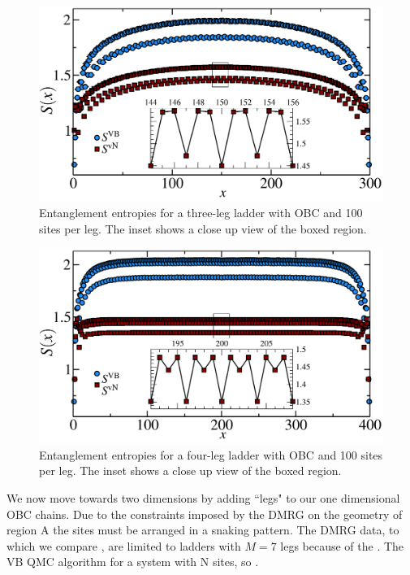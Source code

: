 \begin{figure} { \includegraphics[width=6in]{./figures/paper1/figure3/3-leg-ladder/fig3_final2.pdf}
\caption[Entanglement entropies for a three-leg ladder]{
Entanglement entropies for a three-leg ladder with OBC and 100 sites per leg.  
The inset shows a close up view of the boxed region.
 \label{ladder3} }} 
 \end{figure}
 
 
 \begin{figure} { \includegraphics[width=6in]{./figures/paper1/figure3/4-leg-ladder/4legfig.pdf}
\caption[Entanglement entropies for a four-leg ladder]{
Entanglement entropies for a four-leg ladder with OBC and 100 sites per leg.  
The inset shows a close up view of the boxed region.  
 \label{ladder4} }} 
 \end{figure}
 
 We now move towards two dimensions by adding ``legs" to our one dimensional OBC chains.
 Due to the constraints imposed by the DMRG on the geometry of region A the sites must be arranged in a snaking pattern. 
The DMRG data, to which we compare \vb, are limited to ladders with $M=7$ legs because of the .
 The VB QMC algorithm  for a system with N sites, so .
 
